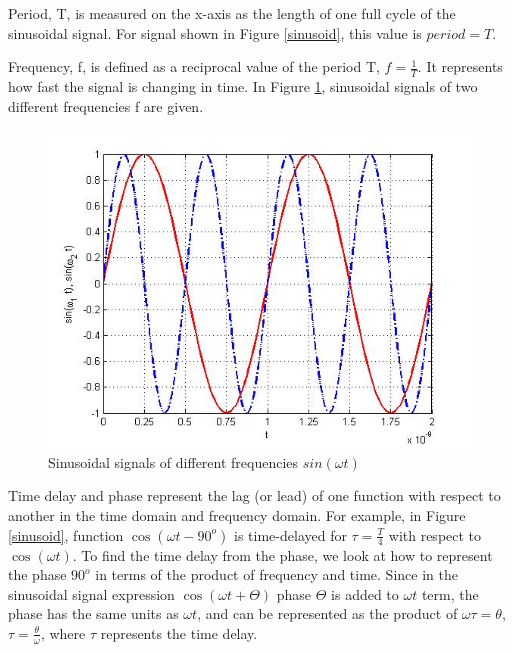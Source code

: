 \documentclass{ximera}
\begin{document}
\begin{definition}
Period, T, is measured on the x-axis as the length of one full cycle of the sinusoidal signal. For signal shown in Figure \ref{sinusoid}, this value is $period=T$. 
\end{definition}

\begin{definition}
Frequency, f,  is defined as a reciprocal value of the period T, $f=\frac{1}{T}$. It represents how fast the signal is changing in time.  In Figure \ref{sinF1F2}, sinusoidal signals of two different frequencies f are given. 

\begin{figure}[htbp]
\includegraphics[scale=0.4]{jpg/cpef6.jpg}
\caption{Sinusoidal signals of different frequencies $sin ( \omega t)$}
\label{sinF1F2}
\end{figure}

\end{definition}

\begin{definition}
Time delay and phase represent the lag (or lead) of one function with respect to another in the time domain and frequency domain. For example, in Figure \ref{sinusoid}, function $ \cos(\omega t - 90^o)$ is time-delayed for $\tau = \frac{T}{4}$ with respect to $\cos (\omega t)$. To find the time delay from the phase, we look at how to represent the phase $90^o$ in terms of the product of frequency and time. Since in the sinusoidal signal expression $\cos (\omega t + \Theta)$  phase $\Theta$ is added to $\omega t$ term, the phase has the same units as $\omega t$, and can be represented as the product of $\omega \tau = \theta$, $\tau = \frac{\theta}{\omega}$, where $\tau$ represents the time delay.
\end{definition}
\end{document}
